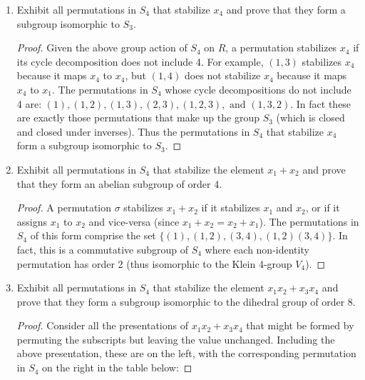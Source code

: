 \documentclass{article}
\begin{document}
\begin{enumerate}[label=(\alph*)]
\begin{proof}
            as desired. Thus the definitions give a group action of $S_4$ on $R$.
          \end{proof}
    \item Exhibit all permutations in $S_4$ that stabilize $x_4$ and prove that they form a subgroup isomorphic to $S_3$.
          \begin{proof}
            Given the above group action of $S_4$ on $R$, a permutation stabilizes $x_4$ if its cycle decomposition does not include 4. For example, $(1, 3)$ stabilizes $x_4$ because it maps $x_4$ to $x_4$, but $(1, 4)$ does not stabilize $x_4$ because it maps $x_4$ to $x_1$. The permutations in $S_4$ whose cycle decompositions do not include 4 are: $(1), (1, 2), (1, 3), (2, 3), (1, 2, 3), \text{ and } (1, 3, 2)$. In fact these are exactly those permutations that make up the group $S_3$ (which is closed and closed under inverses). Thus the permutations in $S_4$ that stabilize $x_4$ form a subgroup isomorphic to $S_3$.
          \end{proof}
    \item Exhibit all permutations in $S_4$ that stabilize the element $x_1 + x_2$ and prove that they form an abelian subgroup of order 4.
          \begin{proof}
            A permutation $\sigma$ stabilizes $x_1 + x_2$ if it stabilizes $x_1$ and $x_2$, or if it assigns $x_1$ to $x_2$ and vice-versa (since $x_1 + x_2 = x_2 + x_1$). The permutations in $S_4$ of this form comprise the set $\{ (1), (1, 2), (3, 4), (1, 2)(3, 4) \}$. In fact, this is a commutative subgroup of $S_4$ where each non-identity permutation has order 2 (thus isomorphic to the Klein 4-group $V_4$).
          \end{proof}
    \item Exhibit all permutations in $S_4$ that stabilize the element $x_1 x_2 + x_3 x_4$ and prove that they form a subgroup isomorphic to the dihedral group of order 8.
          \begin{proof}
            Consider all the presentations of $x_1 x_2 + x_3 x_4$ that might be formed by permuting the subscripts but leaving the value unchanged. Including the above presentation, these are on the left, with the corresponding permutation in $S_4$ on the right in the table below:


\end{proof}
\end{enumerate}
\end{document}
